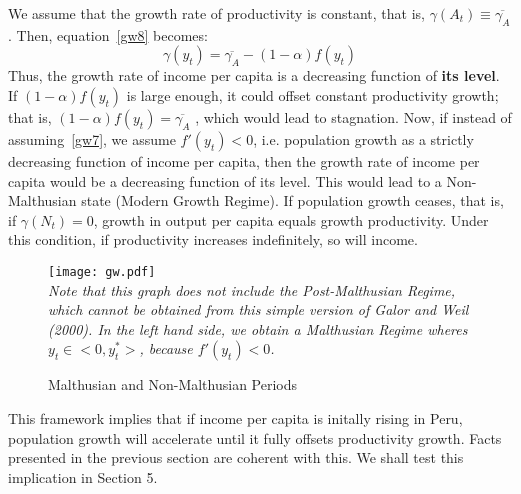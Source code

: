 \documentclass[12pt]{article}%
\begin{document}
We assume that the growth rate of productivity is constant, that is, $\gamma(A_{t})\equiv\overline{\gamma_{A}}$. Then, equation~\ref{gw8} becomes:
\begin{equation}\label{gw9}
\gamma(y_{t})=\overline{\gamma_{A}}-(1-\alpha)f(y_{t})
\end{equation}
Thus, the growth rate of income per capita is a decreasing function of \textbf{its level}. If $(1-\alpha)f(y_{t})$ is large enough, it could offset constant productivity growth; that is, $(1-\alpha)f(y_{t})=\overline{\gamma_{A}}$ , which would lead to stagnation. Now, if instead of assuming~\ref{gw7}, we assume $f'(y_{t})<0$, i.e. population growth as a strictly decreasing function of income per capita, then the growth rate of income per capita would be a decreasing function of its level. This would lead to a Non-Malthusian state (Modern Growth Regime). If population growth ceases, that is, if $\gamma(N_{t})=0$, growth in output per capita equals growth productivity. Under this condition, if productivity increases indefinitely, so will income.
\begin{figure}[h]
\caption{Malthusian and Non-Malthusian Periods}
\centering
\texttt{[image: gw.pdf]} \\
\footnotesize
\textit{Note that this graph does not include the Post-Malthusian Regime, which cannot be obtained from this simple version of Galor and Weil (2000). In the left hand side, we obtain a Malthusian Regime wheres $y_{t}\in<0,y^*_{t}>$, because $f'(y_{t})<0$.}
\label{galorweil}
\end{figure}
This framework implies that if income per capita is initally rising in Peru, population growth will accelerate until it fully offsets productivity growth. Facts presented in the previous section are coherent with this. We shall test this implication in Section 5.
\end{document}
